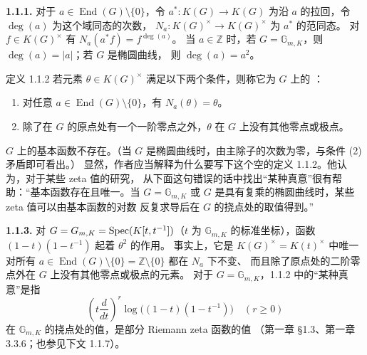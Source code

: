 \noindent\textbf{1.1.1.} 对于 $a\in\operatorname{End}(G)\setminus\{0\}$，令
$a^*:K(G)\to K(G)$ 为沿 $a$ 的拉回，令 $\deg(a)$ 为这个域同态的次数，
$N_a:K(G)^\times\to K(G)^\times$ 为 $a^*$ 的范同态。
对 $f\in K(G)^\times$ 有 $N_a(a^*f)=f^{\deg(a)}$。
当 $a\in\mathbb Z$ 时，若 $G=\mathbb G_{m,K}$，则 $\deg(a)=|a|$；若 $G$ 是椭圆曲线，
则 $\deg(a)=a^2$。
\begin{statement}{定义 1.1.2}
若元素 $\theta\in K(G)^\times$ 满足以下两个条件，则称它为 $G$ 上的
：
\begin{enumerate}[label=(\arabic*)]
\item 对任意 $a\in\operatorname{End}(G)\setminus\{0\}$，有 $N_a(\theta)=\theta$。
\item 除了在 $G$ 的原点处有一个一阶零点之外，$\theta$ 在 $G$ 上没有其他零点或极点。
\end{enumerate}
\end{statement}
$G$ 上的基本函数不存在。（当 $G$ 是椭圆曲线时，由主除子的次数为零，与条件 (2) 矛盾即可看出。）
显然，作者应当解释为什么要写下这个空的定义 1.1.2。他认为，对于某些 zeta 值的研究，
从下面这句错误的话中找出“某种真意”很有帮助：“基本函数存在且唯一。当
$G=\mathbb G_{m,K}$ 或 $G$ 是具有复乘的椭圆曲线时，某些 zeta 值可以由基本函数的对数
反复求导后在 $G$ 的挠点处的取值得到。”

\noindent\textbf{1.1.3.} 对 $G=G_{m,K}=\operatorname{Spec}(K[t,t^{-1}])$（$t$ 为
$\mathbb G_{m,K}$ 的标准坐标），函数 $(1-t)(1-t^{-1})$ 起着 $\theta^2$ 的作用。
事实上，它是 $K(G)^\times=K(t)^\times$ 中唯一对所有
$a\in\operatorname{End}(G)\setminus\{0\}=\mathbb Z\setminus\{0\}$ 都在 $N_a$ 下不变、
而且除了原点处的二阶零点外在 $G$ 上没有其他零点或极点的元素。
对于 $G=\mathbb G_{m,K}$，1.1.2 中的“某种真意”是指
\[
\left(t\frac d{dt}\right)^r\log\bigl((1-t)(1-t^{-1})\bigr)\quad(r\geq0)
\]
在 $\mathbb G_{m,K}$ 的挠点处的值，是部分 Riemann zeta 函数的值
（第一章 §1.3、第一章 3.3.6；也参见下文 1.1.7）。

